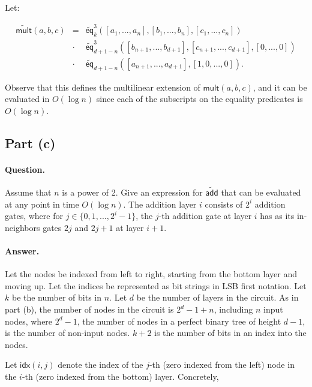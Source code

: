 \documentclass[11pt]{article}
\begin{document}
Let:

\begin{equation}
	\begin{array}{rcl}
		\widetilde{\mathsf{mult}}(a, b, c) &=& 
		\widetilde{\mathsf{eq}}^3_k([a_1, ..., a_n], [b_1, ..., b_n], [c_1, ..., c_n]) \\
		&\cdot& \widetilde{\mathsf{eq}}^3_{d+1-n}([b_{n+1}, ..., b_{d+1}], [c_{n+1}, ..., c_{d+1}], [0, ..., 0]) \\
		&\cdot& \widetilde{\mathsf{eq}}_{d+1-n}([a_{n+1}, ..., a_{d+1}], [1, 0, ..., 0]).
	\end{array}
\end{equation}

Observe that this defines the multilinear extension of $\mathsf{mult}(a, b, c)$,
and it can be evaluated in $O(\log n)$ since each of the subscripts on the
equality predicates is $O(\log n)$.

\subsection{Part (c)}

\paragraph{Question.} Assume that $n$ is a power of 2. Give an expression for $\widetilde{\mathsf{add}}$
that can be evaluated at any point in time $O(\log n)$. The addition layer $i$ consists of $2^i$
addition gates, where for $j \in \{0, 1, ..., 2^i - 1\}$, the $j$-th addition gate at layer $i$
has as its in-neighbors gates $2j$ and $2j+1$ at layer $i+1$.

\paragraph{Answer.} Let the nodes be indexed from left to right, starting from the bottom layer
and moving up. Let the indices be represented as bit strings in LSB first notation. Let $k$ be the
number of bits in $n$. Let $d$ be the number of layers in the circuit. As in part (b), the number of
nodes in the circuit is $2^d-1+n$, including $n$ input nodes, where $2^d-1$, the number of nodes in
a perfect binary tree of height $d-1$, is the number of non-input nodes. $k+2$ is the number of bits
in an index into the nodes.

Let $\mathsf{idx}(i, j)$ denote the index of the $j$-th (zero indexed from the left) node in the
$i$-th (zero indexed from the bottom) layer. Concretely,
\end{document}
